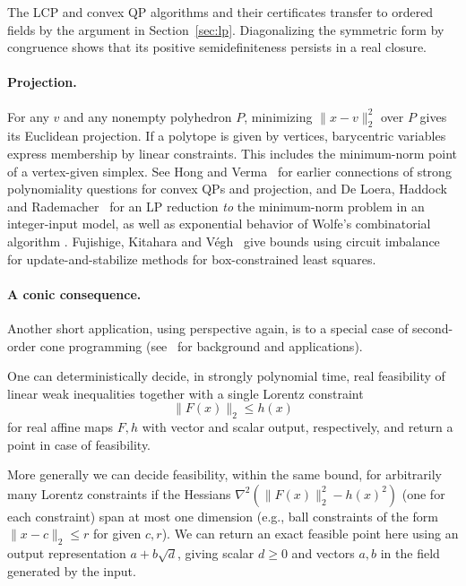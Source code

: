 The LCP and convex QP algorithms and their certificates transfer to
ordered fields by the argument in Section~\ref{sec:lp}. Diagonalizing
the symmetric form by congruence shows that its positive
semidefiniteness persists in a real closure.

\paragraph{Projection.}
For any \(v\) and any nonempty polyhedron \(P\), minimizing
\(\|x-v\|_2^2\) over \(P\) gives its Euclidean projection.
If a polytope is given by vertices, barycentric variables express
membership by linear constraints. This includes the minimum-norm
point of a vertex-given simplex.
See Hong and Verma~\cite{HV} for earlier connections of
strong polynomiality questions for convex QPs and projection, and
De Loera, Haddock and Rademacher~\cite{DLHR}
for an LP reduction \emph{to} the minimum-norm problem in an
integer-input model, as well as exponential behavior of Wolfe's
combinatorial algorithm \cite{W76}.
Fujishige, Kitahara and V\'egh~\cite{FKV} give bounds using circuit
imbalance for update-and-stabilize methods for box-constrained least
squares.

\paragraph{A conic consequence.}
Another short application, using perspective again,
is to a special case of second-order cone programming
(see~\cite{Lobo,Boyd} for background and applications).

\begin{corollary}\label{cor:lor}
One can deterministically decide, in strongly polynomial time,
real feasibility of linear weak inequalities together with a single
Lorentz constraint
\begin{equation}\label{eq:lor}
 \|F(x)\|_2\le h(x)
\end{equation}
for real affine maps \(F,h\) with vector and scalar output, respectively,
and return a point in case of feasibility.

More generally we can decide feasibility, within the same bound,
for arbitrarily many Lorentz constraints if the Hessians
\(\nabla^2(\|F(x)\|^2_2-h(x)^2)\)
(one for each constraint)
span at most one dimension
\textup{(}e.g., ball constraints of the form
\(\|x-c\|_2\le r\) for given \(c,r\)\textup{)}.
We can return an exact feasible point here using an output
representation \(a+b\sqrt d\),
giving scalar \(d\ge0\) and vectors \(a,b\)
in the field generated by the input.
\end{corollary}


